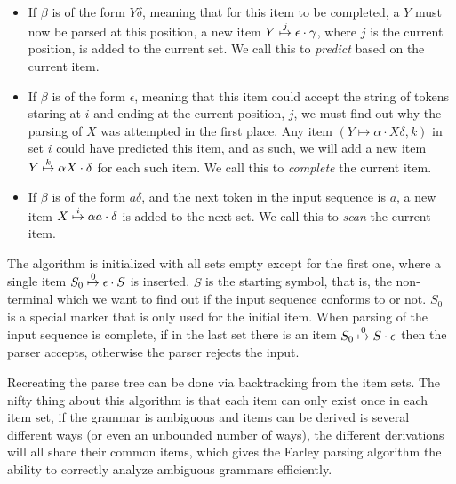 		\begin{itemize}
			\item

				If $\beta$ is of the form $Y\delta$, meaning that for this item
				to be completed, a $Y$ must now be parsed at this position, a
				new item $\earley{Y}{\epsilon}{\gamma}{j}$, where $j$ is the
				current position, is added to the current set. We call this to 
				\emph{predict} based on the current item.

			\item

				If $\beta$ is of the form $\epsilon$, meaning that this item
				could accept the string of tokens staring at $i$ and ending at
				the current position, $j$, we must find out why the parsing of
				$X$ was attempted in the first place. Any item $(Y \mapsto
				\alpha \cdot X\delta, k)$ in set $i$  could have predicted this
				item, and as such, we will add a new item $\earley{Y}{\alpha
				X}{\delta}{k}$ for each such item. We call this to
				\emph{complete} the current item.

			\item

				If $\beta$ is of the form $a\delta$, and the next token in the
				input sequence is $a$, a new item $\earley{X}{\alpha
				a}{\delta}{i}$ is added to the next set. We call this to
				\emph{scan} the current item.

		\end{itemize}

		The algorithm is initialized with all sets empty except for the first
		one, where a single item $\earley{S_0}{\epsilon}{S}{0}$ is inserted.
		$S$ is the starting symbol, that is, the non-terminal which we want to
		find out if the input sequence conforms to or not. $S_0$ is a special
		marker that is only used for the initial item. When parsing of the
		input sequence is complete, if in the last set there is an item
		$\earley{S_0}{S}{\epsilon}{0}$ then the parser accepts, otherwise the
		parser rejects the input.

		Recreating the parse tree can be done via backtracking from the item
		sets. The nifty thing about this algorithm is that each item can only
		exist once in each item set, if the grammar is ambiguous and items can
		be derived is several different ways (or even an unbounded number of
		ways), the different derivations will all share their common items,
		which gives the Earley parsing algorithm the ability to correctly
		analyze ambiguous grammars efficiently.
	
